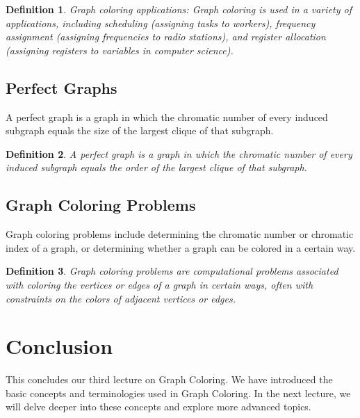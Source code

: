 \documentclass{article}
\newtheorem{definition}{Definition}
\begin{document}
\begin{definition}
	\textit{Graph coloring applications}: Graph coloring is used in a variety of applications, including scheduling (assigning tasks to workers), frequency assignment (assigning frequencies to radio stations), and register allocation (assigning registers to variables in computer science).
\end{definition}

\subsection{Perfect Graphs}
A perfect graph is a graph in which the chromatic number of every induced subgraph equals the size of the largest clique of that subgraph.

\begin{definition}
	A \textit{perfect graph} is a graph in which the chromatic number of every induced subgraph equals the order of the largest clique of that subgraph.
\end{definition}

\subsection{Graph Coloring Problems}
Graph coloring problems include determining the chromatic number or chromatic index of a graph, or determining whether a graph can be colored in a certain way.

\begin{definition}
	\textit{Graph coloring problems} are computational problems associated with coloring the vertices or edges of a graph in certain ways, often with constraints on the colors of adjacent vertices or edges.
\end{definition}

\section{Conclusion}
This concludes our third lecture on Graph Coloring. We have introduced the basic concepts and terminologies used in Graph Coloring. In the next lecture, we will delve deeper into these concepts and explore more advanced topics.
\end{document}
